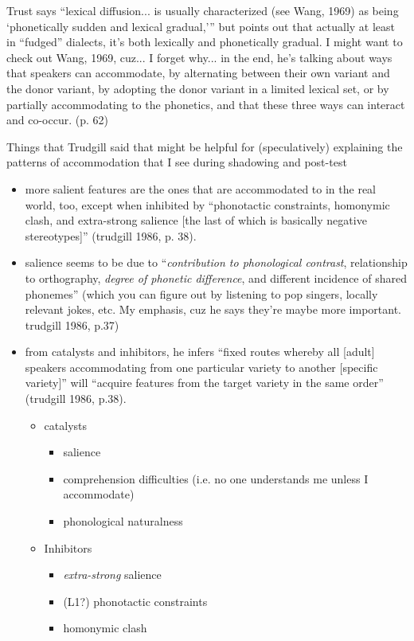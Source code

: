     Trust says ``lexical diffusion... is usually characterized (see Wang, 1969) as being `phonetically sudden and lexical gradual,''' but points out that actually at least in ``fudged'' dialects, it's both lexically and phonetically gradual. I might want to check out Wang, 1969, cuz... I forget why... in the end, he's talking about ways that speakers can accommodate, by alternating between their own variant and the donor variant, by adopting the donor variant in a limited lexical set, or by partially accommodating to the phonetics, and that these three ways can interact and co-occur. (p. 62)
    
    Things that Trudgill said that might be helpful for (speculatively) explaining the patterns of accommodation that I see during shadowing and post-test
    \begin{itemize}
        \item more salient features are the ones that are accommodated to in the real world, too, except when inhibited by ``phonotactic constraints, homonymic clash, and extra-strong salience [the last of which is basically negative stereotypes]'' (trudgill 1986, p. 38).
        \item salience seems to be due to ``\emph{contribution to phonological contrast}, relationship to orthography, \emph{degree of phonetic difference}, and different incidence of shared phonemes'' (which you can figure out by listening to pop singers, locally relevant jokes, etc. My emphasis, cuz he says they're maybe more important. trudgill 1986, p.37)
        \item from catalysts and inhibitors, he infers ``fixed routes whereby all [adult] speakers accommodating from one particular variety to another [specific variety]'' will ``acquire features from the target variety in the same order'' (trudgill 1986, p.38).
        \begin{itemize}
            \item catalysts
            \begin{itemize}
                \item salience
                \item comprehension difficulties (i.e. no one understands me unless I accommodate)
                \item phonological naturalness
            \end{itemize}
            \item Inhibitors
            \begin{itemize}
                \item \emph{extra-strong} salience
                \item (L1?) phonotactic constraints
                \item homonymic clash
            \end{itemize}
        \end{itemize}
    \end{itemize}